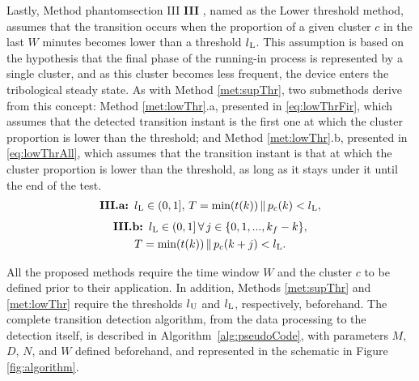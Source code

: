 \documentclass[preprint,11pt,number]{elsarticle}
\makeatletter
\newcommand{\labeltext}[3][]{%
    \@bsphack%
    \csname phantomsection\endcsname%
    \def\tst{#1}%
    \def\labelmarkup{}%
    \def\refmarkup{}%
    \ifx\tst\empty\def\@currentlabel{\refmarkup{#2}}{\label{#3}}%
    \else\def\@currentlabel{\refmarkup{#1}}{\label{#3}}\fi%
    \@esphack%
    \labelmarkup{#2}%
}
\makeatother
\begin{document}
Lastly, Method \labeltext[III]{\textbf{III}}{met:lowThr}, named as the Lower threshold method, assumes that the transition occurs when the proportion of a given cluster $c$ in the last $W$ minutes becomes lower than a threshold $l\textsubscript{L}$. This assumption is based on the hypothesis that the final phase of the running-in process is represented by a single cluster, and as this cluster becomes less frequent, the device enters the tribological steady state. As with Method \ref{met:supThr}, two submethods derive from this concept: Method \ref{met:lowThr}.a, presented in \eqref{eq:lowThrFir}, which assumes that the detected transition instant is the first one at which the cluster proportion is lower than the threshold; and Method \ref{met:lowThr}.b, presented in \eqref{eq:lowThrAll}, which assumes that the transition instant is that at which the cluster proportion is lower than the threshold, as long as it stays under it until the end of the test.
\begin{equation}\label{eq:lowThrFir}
\begin{gathered}
    \textbf{III.a: } l\textsubscript{L} \in (0,1], \,T = \text{min}(t(k)) \,\|\,p_c(k)<l\textsubscript{L},
\end{gathered}
\end{equation}
\begin{equation}\label{eq:lowThrAll}
\begin{gathered}
    \textbf{III.b: } l\textsubscript{L} \in (0,1] \,\forall\, j \in \{0, 1, ..., k_f-k\}, \\ T = \text{min}(t(k))\,\|\,p_c(k+j)<l\textsubscript{L}.
\end{gathered}
\end{equation}

All the proposed methods require the time window $W$ and the cluster $c$ to be defined prior to their application. In addition, Methods \ref{met:supThr} and \ref{met:lowThr} require the thresholds $l\textsubscript{U}$ and $l\textsubscript{L}$, respectively, beforehand. The complete transition detection algorithm, from the data processing to the detection itself, is described in Algorithm~\ref{alg:pseudoCode}, with parameters $M$, $D$, $N$, and $W$ defined beforehand, \color{red} and represented in the schematic in Figure \ref{fig:algorithm}. \color{black}
\end{document}
